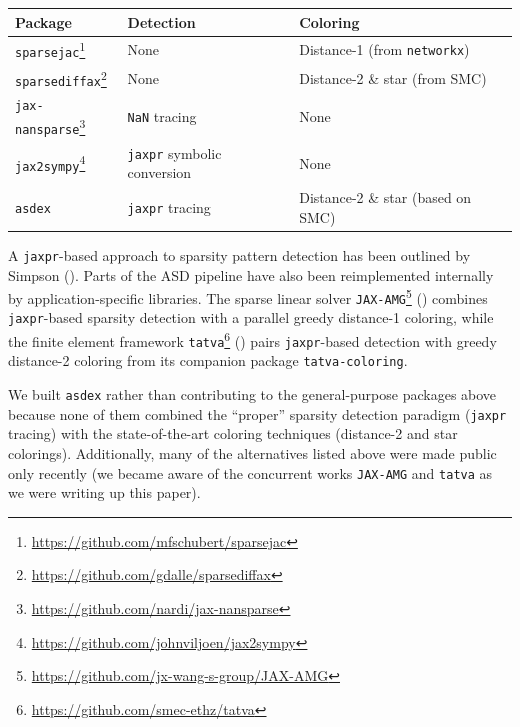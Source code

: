 \documentclass[
]{article}
\begin{document}
\begin{longtable}[]{@{}
  >{\raggedright\arraybackslash}p{}
  >{\raggedright\arraybackslash}p{}
  >{\raggedright\arraybackslash}p{}@{}}
\toprule\noalign{}
\begin{minipage}[b]{\linewidth}\raggedright
Package
\end{minipage} & \begin{minipage}[b]{\linewidth}\raggedright
Detection
\end{minipage} & \begin{minipage}[b]{\linewidth}\raggedright
Coloring
\end{minipage} \\
\midrule\noalign{}
\endhead
\bottomrule\noalign{}
\endlastfoot
\texttt{sparsejac}\footnote{\url{https://github.com/mfschubert/sparsejac}}
& None & Distance-1 (from \texttt{networkx}) \\
\texttt{sparsediffax}\footnote{\url{https://github.com/gdalle/sparsediffax}}
& None & Distance-2 \& star (from SMC) \\
\texttt{jax-nansparse}\footnote{\url{https://github.com/nardi/jax-nansparse}}
& \texttt{NaN} tracing & None \\
\texttt{jax2sympy}\footnote{\url{https://github.com/johnviljoen/jax2sympy}}
& \texttt{jaxpr} symbolic conversion & None \\
\texttt{asdex} & \texttt{jaxpr} tracing & Distance-2 \& star (based on
SMC) \\
\end{longtable}

A \texttt{jaxpr}-based approach to sparsity pattern detection has been
outlined by Simpson ().
Parts of the ASD pipeline have also been reimplemented internally by
application-specific libraries. The sparse linear solver
\texttt{JAX-AMG}\footnote{\url{https://github.com/jx-wang-s-group/JAX-AMG}}
() combines
\texttt{jaxpr}-based sparsity detection with a parallel greedy
distance-1 coloring, while the finite element framework
\texttt{tatva}\footnote{\url{https://github.com/smec-ethz/tatva}}
() pairs
\texttt{jaxpr}-based detection with greedy distance-2 coloring from its
companion package \texttt{tatva-coloring}.

We built \texttt{asdex} rather than contributing to the general-purpose
packages above because none of them combined the ``proper'' sparsity
detection paradigm (\texttt{jaxpr} tracing) with the state-of-the-art
coloring techniques (distance-2 and star colorings). Additionally, many
of the alternatives listed above were made public only recently (we
became aware of the concurrent works \texttt{JAX-AMG} and \texttt{tatva}
as we were writing up this paper).
\end{document}
